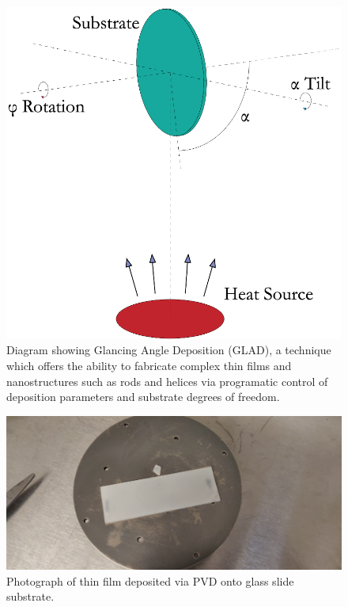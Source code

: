 \begin{figure}[t]
  \centering
  \includegraphics[width=.8\textwidth]{figs/4-Raman/GLAD.png}
  \caption{Diagram showing Glancing Angle Deposition (\acs{GLAD}), a technique which offers the ability to fabricate complex thin films and nanostructures such as rods and helices via programatic control of deposition parameters and substrate degrees of freedom.}
  \label{fig:Raman:GLAD}
\end{figure}

\begin{figure}[t]
  \centering
  \includegraphics[width=\textwidth]{figs/4-Raman/slide-with-TeO2-film-on-substrate.jpeg}
  \caption{Photograph of  thin film deposited via \ac{PVD} onto glass slide substrate.}%
  \label{fig:Raman:TeO2onSubstrate}
\end{figure}

